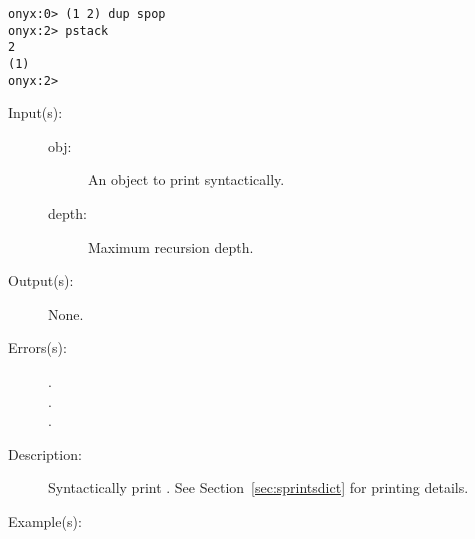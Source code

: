 \begin{description}
\begin{description}
\begin{verbatim}
onyx:0> (1 2) dup spop
onyx:2> pstack
2
(1)
onyx:2>
		\end{verbatim}
	\end{description}
\label{systemdict:sprint}
\item[{\onyxop{obj depth}{sprint}{--}}: ]
	\begin{description}\item[]
	\item[Input(s): ]
		\begin{description}\item[]
		\item[obj: ]
			An object to print syntactically.
		\item[depth: ]
			Maximum recursion depth.
		\end{description}
	\item[Output(s): ] None.
	\item[Errors(s): ]
		\begin{description}\item[]
		\item[.]
		\item[.]
		\item[.]
		\end{description}
	\item[Description: ]
		Syntactically print .  See
		Section~\ref{sec:sprintsdict} for printing details.
	\item[Example(s): ]\begin{verbatim}


\end{verbatim}
\end{description}
\end{description}
